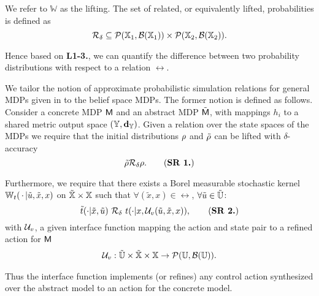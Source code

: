 \documentclass{ifacconf}
\begin{document}
We refer to  $\mathbb W$ as the lifting. %
The set of related, or equivalently lifted, probabilities is defined as 
	\[\relax\mathcal{R}_\delta\subseteq \mathcal{P}({\mathbb{X}}_1,\mathcal B({\mathbb{X}}_1))\times \mathcal{P}({\mathbb{X}}_2,\mathcal B({\mathbb{X}}_2)).\] 


Hence based on \textbf{L1-3.}, we can quantify the difference between two probability distributions with respect to a relation $\rel$.

 
We tailor the   notion of approximate probabilistic simulation relations for general MDPs given in \citep{haesaert2017verification} to the belief space MDPs.
  The former notion is defined as follows. 
Consider a concrete MDP $\mathsf{M}$ and an abstract  MDP $\tilde{\mathsf{M}}$, with mappings $h_i$ to a shared {metric} output space  $({\mathbb{Y}},\mathbf{d}_{\mathbb{Y}})$.  
Given a relation over the state spaces of the MDPs we require that the initial distributions $\rho$ and $\tilde{\rho}$ can be lifted with $\delta$-accuracy
\begin{equation}
\tilde\init \bar \rel_\delta \init.
	\tag{\textbf{SR 1.}}
\end{equation}
  
Furthermore, we require that there exists a Borel measurable stochastic kernel $\mathbb{W}_{t}(\,\cdot\,{\mid} \tilde u,\tilde x,x)$ on $\tilde {{\mathbb{X}}}\times{\mathbb{X}}$ such that $\forall (\tilde x,x)\in \rel$, $\forall \tilde u\in\tilde {{\mathbb{U}}}$:
\begin{equation}\tilde \tr(\cdot| \tilde x, \tilde u)\ \bar \rel_\delta \  \tr(\cdot| x, \InF(\tilde u,\tilde x,x)),\tag{\textbf{SR 2.}}\end{equation} with $\mathcal{U}_{v}$, a given interface function mapping the action and state pair to a refined action for $\mathsf{M}$
\begin{align*}\mathcal{U}_{v}: \tilde {{\mathbb{U}}}\times \tilde {{\mathbb{X}}}\times{\mathbb{X}} \rightarrow \mathcal{P}({\mathbb{U}},\mathcal B({\mathbb{U}})). \end{align*}

Thus the interface function implements (or refines) any control action synthesized over the abstract model to an action for the concrete model.
\end{document}
